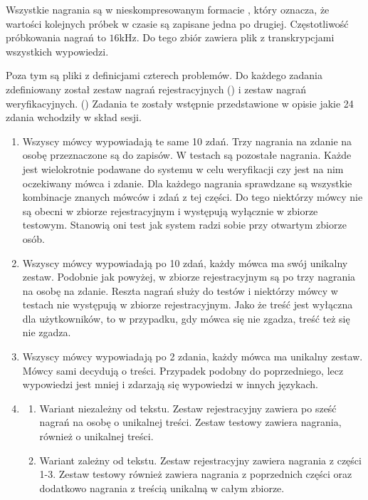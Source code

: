 Wszystkie nagrania są w nieskompresowanym formacie , który oznacza, że wartości kolejnych próbek w czasie
są zapisane jedna po drugiej. Częstotliwość próbkowania nagrań to $16$kHz. Do tego zbiór zawiera plik z transkrypcjami
wszystkich wypowiedzi.

Poza tym są pliki z definicjami czterech problemów. Do każdego zadania zdefiniowany został zestaw nagrań rejestracyjnych
() i zestaw nagrań weryfikacyjnych. () Zadania te zostały wstępnie przedstawione
w opisie jakie 24 zdania wchodziły w skład sesji.

\begin{enumerate}
    \item Wszyscy mówcy wypowiadają te same 10 zdań. Trzy nagrania na zdanie na osobę przeznaczone są do zapisów. W testach
        są pozostałe nagrania. Każde jest wielokrotnie podawane do systemu w celu weryfikacji czy jest na nim oczekiwany mówca
        i zdanie. Dla każdego nagrania sprawdzane są wszystkie kombinacje znanych mówców i zdań z tej części. Do tego niektórzy
        mówcy nie są obecni w zbiorze rejestracyjnym i występują wyłącznie w zbiorze testowym. Stanowią oni test jak system
        radzi sobie przy otwartym zbiorze osób.
    \item Wszyscy mówcy wypowiadają po 10 zdań, każdy mówca ma swój unikalny zestaw. Podobnie jak powyżej, w zbiorze
        rejestracyjnym są po trzy nagrania na osobę na zdanie. Reszta nagrań służy do testów i niektórzy
        mówcy w testach nie występują w zbiorze rejestracyjnym.
        Jako że treść jest wyłączna dla użytkowników, to w przypadku, gdy mówca się nie zgadza, treść też się nie zgadza.
    \item Wszyscy mówcy wypowiadają po 2 zdania, każdy mówca ma unikalny zestaw. Mówcy sami decydują o treści.
        Przypadek podobny do poprzedniego, lecz wypowiedzi jest mniej i zdarzają się wypowiedzi w innych językach.
    \item
        \begin{enumerate}
            \item Wariant niezależny od tekstu. Zestaw rejestracyjny zawiera po sześć nagrań na osobę o unikalnej treści.
                Zestaw testowy zawiera nagrania, również o unikalnej treści.
            \item Wariant zależny od tekstu. Zestaw rejestracyjny zawiera nagrania z części 1-3. Zestaw testowy również
                zawiera nagrania z poprzednich części oraz dodatkowo nagrania z treścią unikalną w całym zbiorze.
        \end{enumerate}
\end{enumerate}

